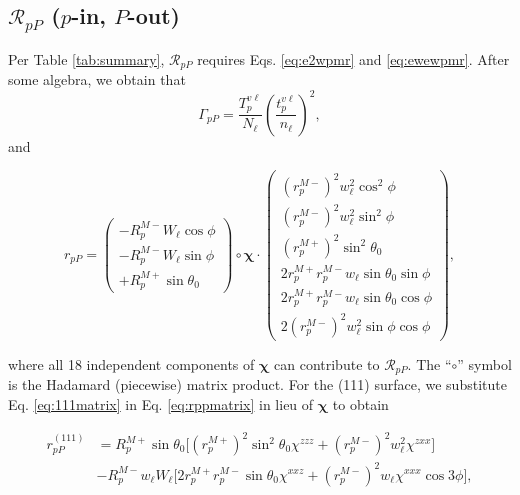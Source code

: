 \documentclass[aps,pra,10pt,amsmath,notitlepage,letterpaper]{revtex4-1}
\begin{document}

\subsection{\texorpdfstring{$\mathcal{R}_{pP}$ ($p$-in, $P$-out)}
{RpP (p-in, P-out)}}
\label{sec:RpP} 

Per Table \ref{tab:summary}, $\mathcal{R}_{pP}$ requires Eqs. \eqref{eq:e2wpmr}
and \eqref{eq:ewewpmr}. After some algebra, we obtain that
\begin{equation}\label{eq:mc78}
\Gamma_{pP} =
\frac{T^{v\ell}_{p}}{N_{\ell}}
\left(\frac{t^{v\ell}_{p}}{n_{\ell}}\right)^{2}
,
\end{equation}
and
\begin{widetext}
\begin{equation}\label{eq:rppmatrix}
r_{pP} =
\begin{pmatrix}
-R^{M-}_{p}W_{\ell}\cos\phi \\[3pt]
-R^{M-}_{p}W_{\ell}\sin\phi \\[3pt]
+R^{M+}_{p}\sin\theta_{0}
\end{pmatrix}
\circ
\boldsymbol{\chi}
\cdot
\begin{pmatrix}
\left(r^{M-}_{p}\right)^{2}w^{2}_{\ell}\cos^{2}\phi\\[8pt]
\left(r^{M-}_{p}\right)^{2}w^{2}_{\ell}\sin^{2}\phi\\[8pt]
\left(r^{M+}_{p}\right)^{2}\sin^{2}\theta_{0}\\[8pt]
2r^{M+}_{p}r^{M-}_{p}w_{\ell}\sin\theta_{0}\sin\phi\\[8pt]
2r^{M+}_{p}r^{M-}_{p}w_{\ell}\sin\theta_{0}\cos\phi\\[8pt]
2\left(r^{M-}_{p}\right)^{2}w^{2}_{\ell}\sin\phi\cos\phi
\end{pmatrix}
,
\end{equation}
\end{widetext}
where all 18 independent components of $\boldsymbol{\chi}$ can contribute to
$\mathcal{R}_{pP}$. The ``$\circ$'' symbol is the Hadamard (piecewise) matrix
product. For the (111) surface, we substitute Eq. \eqref{eq:111matrix} in Eq.
\eqref{eq:rppmatrix} in lieu of $\boldsymbol{\chi}$ to obtain
\begin{widetext}
\begin{equation}\label{eq:rpp111}
\begin{split}
r^{(111)}_{pP} &= 
R^{M+}_{p}\sin\theta_{0}
\Big[
  \left(r^{M+}_{p}\right)^{2}\sin^{2}\theta_{0}\chi^{zzz}
+ \left(r^{M-}_{p}\right)^{2}w^{2}_{\ell}\chi^{zxx}
\Big]\\
&- R^{M-}_{p}w_{\ell}W_{\ell}
\Big[
  2r^{M+}_{p}r^{M-}_{p}\sin\theta_{0}\chi^{xxz}
+ \left(r^{M-}_{p}\right)^{2}w_{\ell}\chi^{xxx}\cos3\phi
\Big],
\end{split}
\end{equation}
\end{widetext}
\end{document}
